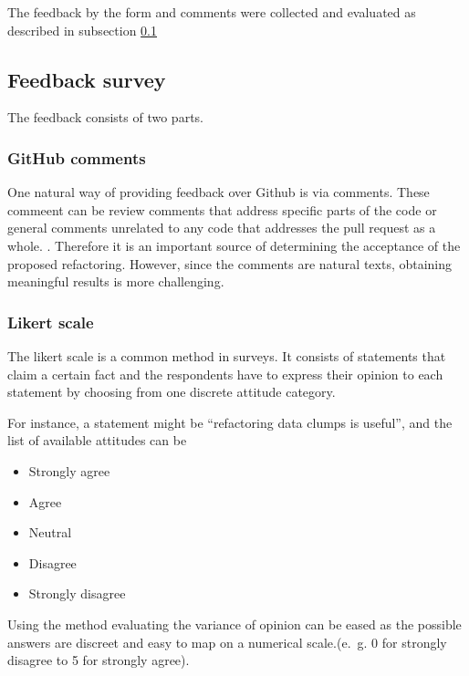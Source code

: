 The feedback by the form and comments were collected and evaluated as described in subsection \ref{sec:feedback_survey}

\subsection{Feedback survey}\label{sec:feedback_survey}

The feedback consists of two parts.
\subsubsection{GitHub comments}
One  natural way of providing feedback over Github is via comments. These commeent can be review comments that address specific parts of the code or general comments unrelated to any code that addresses the pull request as a whole. \cite{10.1145/3597208}. Therefore it is an important source of determining the acceptance of the proposed refactoring. However, since the comments are natural texts, obtaining meaningful results is more challenging. 

\subsubsection{Likert scale}
The likert scale is a common method in surveys. It consists of statements that claim a certain fact and the respondents have to express their opinion to each statement by choosing from one discrete attitude category. \cite{edmondson2005likert}

For instance, a statement might be \enquote{refactoring data clumps is useful}, and the list of available attitudes can be
\begin{itemize}
    \item Strongly agree
    \item Agree
    \item Neutral
    \item Disagree
    \item Strongly disagree
\end{itemize}

Using the method evaluating the variance of opinion can be eased as the possible answers are discreet and easy to map on a numerical scale.(e.~g. 0 for strongly disagree to 5 for strongly agree).


